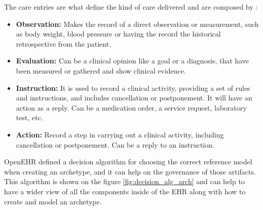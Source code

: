 \documentclass[mim_thesis.tex]{subfiles}
\begin{document}
The care entries are what define the kind of care delivered and are composed by \citep{openEHRCKM}:
\begin{itemize}[noitemsep]
\item \textbf{Observation:} Makes the record of a direct observation or measurement, such as body weight, blood pressure or having the record the historical retrospective from the patient.
\item \textbf{Evaluation:} Can be a clinical opinion like a goal or a diagnosis, that have been measured or gathered and show clinical evidence.
\item \textbf{Instruction:} It is used to record a clinical activity, providing a set of rules and instructions, and includes cancellation or postponement. It will have an action as a reply. Can be a medication order, a service request, laboratory test, etc.
\item \textbf{Action:} Record a step in carrying out a clinical activity, including cancellation or postponement. Can be a reply to an instruction. 
\end{itemize}

OpenEHR defined a decision algorithm for choosing the correct reference model when creating an archetype, and it can help on the governance of those artifacts. This algorithm is shown on the figure \ref{fig:decision_alg_arch} and can help to have a wider view of all the components inside of the EHR along with how to create and model an archetype.
\end{document}
